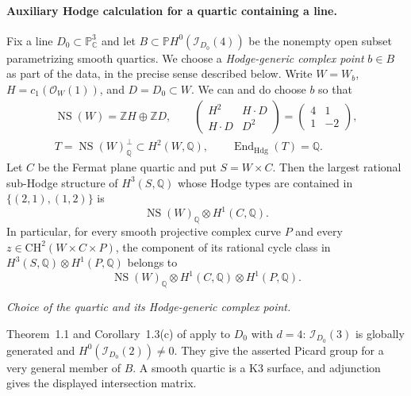 \paragraph{Auxiliary Hodge calculation for a quartic containing a line.}
Fix a line $D_0\subset\mathbb P^3_{\mathbb C}$ and let
$B\subset\mathbb P H^0(\mathcal I_{D_0}(4))$ be the nonempty open subset
parametrizing smooth quartics. We choose a \emph{Hodge-generic complex
point} $b\in B$ as part of the data, in the precise sense described below.
Write $W=W_b$, $H=c_1(\mathcal O_W(1))$, and $D=D_0\subset W$.
We can and do choose $b$ so that
\[
 \begin{gathered}
 \operatorname{NS}(W)=\mathbb ZH\oplus\mathbb ZD,
 \qquad
 \begin{pmatrix}H^2&H\cdot D\\H\cdot D&D^2\end{pmatrix}
 =\begin{pmatrix}4&1\\1&-2\end{pmatrix},\\
 T=\operatorname{NS}(W)_{\mathbb Q}^{\perp}
          \subset H^2(W,\mathbb Q),
 \qquad \operatorname{End}_{\mathrm{Hdg}}(T)=\mathbb Q.
 \end{gathered}
\]
Let $C$ be the Fermat plane quartic and put $S=W\times C$.
Then the largest rational sub-Hodge structure of $H^3(S,\mathbb Q)$
whose Hodge types are contained in $\{(2,1),(1,2)\}$ is
\begin{equation}\label{eq:N6-level-one}
       \operatorname{NS}(W)_{\mathbb Q}\otimes H^1(C,\mathbb Q).
\end{equation}
In particular, for every smooth projective complex curve $P$ and every
$z\in\mathrm{CH}^2(W\times C\times P)$, the component of its rational
cycle class in $H^3(S,\mathbb Q)\otimes H^1(P,\mathbb Q)$ belongs to
\[
 \operatorname{NS}(W)_{\mathbb Q}\otimes
 H^1(C,\mathbb Q)\otimes H^1(P,\mathbb Q).
\]

\emph{Choice of the quartic and its Hodge-generic complex point.}\par
Theorem~1.1 and Corollary~1.3(c) of
\citet[p.~2 of the opened author version]{frBrevikNollet2011}
apply to $D_0$ with $d=4$: $\mathcal I_{D_0}(3)$ is globally generated
and $H^0(\mathcal I_{D_0}(2))\ne0$. They give the asserted Picard group
for a very general member of $B$. A smooth quartic is a K3 surface,
and adjunction gives the displayed intersection matrix.

